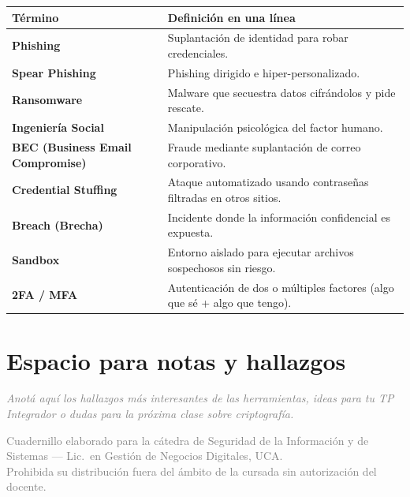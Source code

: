 \documentclass[12pt,a4paper]{article}
\renewcommand{\arraystretch}{1.25}
\begin{document}
\renewcommand{\arraystretch}{1.4}
\begin{tabularx}{\textwidth}{>{\bfseries}p{4.5cm}X}
\toprule
\textbf{T\'ermino} & \textbf{Definici\'on en una l\'inea} \\
\midrule
Phishing & Suplantaci\'on de identidad para robar credenciales. \\
Spear Phishing & Phishing dirigido e hiper-personalizado. \\
Ransomware & Malware que secuestra datos cifr\'andolos y pide rescate. \\
Ingenier\'ia Social & Manipulaci\'on psicol\'ogica del factor humano. \\
BEC (Business Email Compromise) & Fraude mediante suplantaci\'on de correo corporativo. \\
Credential Stuffing & Ataque automatizado usando contrase\~nas filtradas en otros sitios. \\
Breach (Brecha) & Incidente donde la informaci\'on confidencial es expuesta. \\
Sandbox & Entorno aislado para ejecutar archivos sospechosos sin riesgo. \\
2FA / MFA & Autenticaci\'on de dos o m\'ultiples factores (algo que s\'e + algo que tengo). \\
\bottomrule
\end{tabularx}

\vspace{1cm}

\section{Espacio para notas y hallazgos}

\begin{tcolorbox}[colback=grisClaro, colframe=gray!50, arc=2mm, height=6cm]
\textcolor{gray}{\itshape Anot\'a aqu\'i los hallazgos m\'as interesantes de las herramientas, ideas para tu TP Integrador o dudas para la pr\'oxima clase sobre criptograf\'ia.}
\end{tcolorbox}

\vfill
\begin{center}
\small\textcolor{gray}{%
Cuadernillo elaborado para la c\'atedra de Seguridad de la Informaci\'on y de
Sistemas --- Lic.\ en Gesti\'on de Negocios Digitales, UCA.\\
Prohibida su distribuci\'on fuera del \'ambito de la cursada sin autorizaci\'on del docente.}
\end{center}
\end{document}
